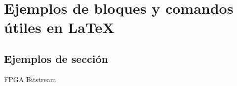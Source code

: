 \chapter{Ejemplos de bloques y comandos útiles en LaTeX\label{sec:ejemplos}}

\section{Ejemplos de sección}
%
%











% 
\gls{FPGA}
\gls{Bitstream}